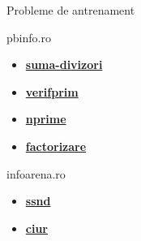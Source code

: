 \documentclass{beamer}
\begin{document}
\begin{frame}{Probleme de antrenament}
  \begin{block}{pbinfo.ro}
    \begin{itemize}
      \item \href{https://www.pbinfo.ro/probleme/376/suma-divizori}{\textbf{suma-divizori}}
      \item \href{https://www.pbinfo.ro/probleme/45/verifprim}{\textbf{verifprim}}
      \item \href{https://www.pbinfo.ro/probleme/373/nprime}{\textbf{nprime}}
      \item \href{https://www.pbinfo.ro/probleme/62/factorizare}{\textbf{factorizare}}
    \end{itemize}
  \end{block}
  \begin{block}{infoarena.ro}
    \begin{itemize}
      \item \href{https://www.infoarena.ro/problema/ssnd}{\textbf{ssnd}}
      \item \href{https://www.infoarena.ro/problema/ciur}{\textbf{ciur}}
    \end{itemize}
  \end{block}
\end{frame}
\end{document}
